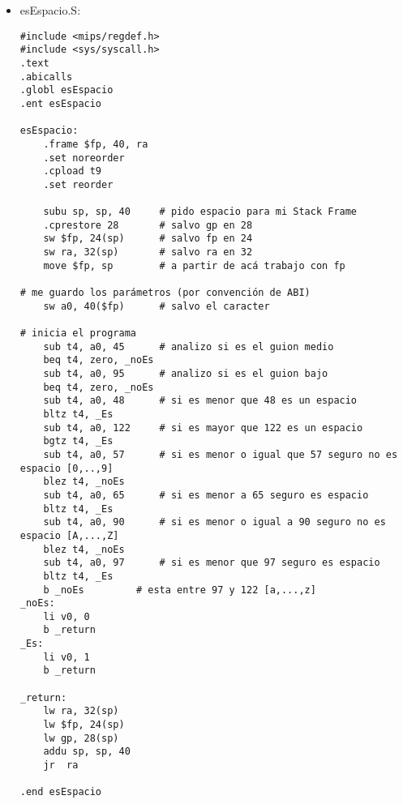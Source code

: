 \documentclass[a4paper,10pt]{article}
\begin{document}
\begin{itemize}
\begin{verbatim}
_error_en_syscall: # devuelvo en v0 un -1 y en v1 el código de error generado
#por el syscall
	move v1, v0
	li v0, -1
	b _return

_eof: # devuelvo en v0 un 0 y en v1 un 0
	li v0, 0
	li v1, 0
	b _return

_relectura:	
	lw t0, 16($fp)			# mi posición inicial estaba en LTA. la levanto
	add t0, t0, v0			# mi nueva posición inicial, será la anterior + los caracteres leídos
	sw t0, 16($fp)			# me guardo la nueva posición inicial temporal en LTA
	move a1, t0
	la t3, FDESCRIPTOR_DE_LECTURA
	lw a0, 0(t3)
	lw t1, 48($fp)
	subu t0, t1, v0					# mi nuevo tamaño será el tamaño anterior - los caracteres leídos
	move a2, t0
	syscall
	b _comprobacion

_lectura_inicial:
	b _rellenar_buffer

_return:
	lw ra, 32(sp)
	lw $fp, 24(sp)
	lw gp, 28(sp)
	addu sp, sp, 40
	jr	ra

.end getch

.data

FDESCRIPTOR_DE_LECTURA: .word 0
FDESCRIPTOR_DE_ESCRITURA: .word 0
IBYTES: .word 0
OBYTES: .word 0
POS_INICIAL_IB: .word 0
POS_INICIAL_OB: .word 0
POS_INICIAL_BUFF_PAL: .word 0
SALTO_DE_LINEA: .asciiz "\n"
ESPACIO: .byte ' '
TAM_BUFF_PAL: .word 100
ULTIMO_CHAR_REDIM: .word

\end{verbatim}
\item esEspacio.S: \\
\begin{verbatim}
#include <mips/regdef.h>
#include <sys/syscall.h>
.text
.abicalls
.globl esEspacio
.ent esEspacio

esEspacio:
	.frame $fp, 40, ra
	.set noreorder
	.cpload t9
	.set reorder

	subu sp, sp, 40 	# pido espacio para mi Stack Frame
	.cprestore 28		# salvo gp en 28
	sw $fp, 24(sp)		# salvo fp en 24
	sw ra, 32(sp)		# salvo ra en 32
	move $fp, sp		# a partir de acá trabajo con fp
	
# me guardo los parámetros (por convención de ABI)
	sw a0, 40($fp)		# salvo el caracter

# inicia el programa
	sub t4, a0, 45		# analizo si es el guion medio
	beq t4, zero, _noEs		
	sub t4, a0, 95		# analizo si es el guion bajo
	beq t4, zero, _noEs
	sub t4, a0, 48		# si es menor que 48 es un espacio
	bltz t4, _Es
	sub t4, a0, 122		# si es mayor que 122 es un espacio
	bgtz t4, _Es
	sub t4, a0, 57		# si es menor o igual que 57 seguro no es espacio [0,..,9]
	blez t4, _noEs
	sub t4, a0, 65		# si es menor a 65 seguro es espacio
	bltz t4, _Es
	sub t4, a0, 90		# si es menor o igual a 90 seguro no es espacio [A,...,Z]
	blez t4, _noEs
	sub t4, a0, 97		# si es menor que 97 seguro es espacio
	bltz t4, _Es
	b _noEs			# esta entre 97 y 122 [a,...,z]
_noEs:
	li v0, 0
	b _return
_Es:
	li v0, 1
	b _return

_return:
	lw ra, 32(sp)
	lw $fp, 24(sp)
	lw gp, 28(sp)
	addu sp, sp, 40
	jr	ra

.end esEspacio

\end{verbatim}
\end{itemize}
\end{document}
